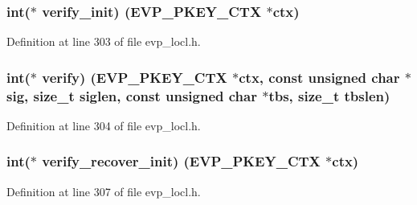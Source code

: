\subsubsection[{\texorpdfstring{verify\+\_\+init}{verify_init}}]{\setlength{\rightskip}{0pt plus 5cm}int($\ast$ verify\+\_\+init) ({\bf E\+V\+P\+\_\+\+P\+K\+E\+Y\+\_\+\+C\+TX} $\ast$ctx)}\hypertarget{structevp__pkey__method__st_a52c168da0ac4697f2d040515bf83e832}{}\label{structevp__pkey__method__st_a52c168da0ac4697f2d040515bf83e832}


Definition at line 303 of file evp\+\_\+locl.\+h.

\subsubsection[{\texorpdfstring{verify}{verify}}]{\setlength{\rightskip}{0pt plus 5cm}int($\ast$ verify) ({\bf E\+V\+P\+\_\+\+P\+K\+E\+Y\+\_\+\+C\+TX} $\ast$ctx, const unsigned char $\ast$sig, size\+\_\+t siglen, const unsigned char $\ast$tbs, size\+\_\+t tbslen)}\hypertarget{structevp__pkey__method__st_a4130d530978618dbcd8236e5df96bdcb}{}\label{structevp__pkey__method__st_a4130d530978618dbcd8236e5df96bdcb}


Definition at line 304 of file evp\+\_\+locl.\+h.

\subsubsection[{\texorpdfstring{verify\+\_\+recover\+\_\+init}{verify_recover_init}}]{\setlength{\rightskip}{0pt plus 5cm}int($\ast$ verify\+\_\+recover\+\_\+init) ({\bf E\+V\+P\+\_\+\+P\+K\+E\+Y\+\_\+\+C\+TX} $\ast$ctx)}\hypertarget{structevp__pkey__method__st_a5fd28dac772d0a8ebcbf136e4c56f836}{}\label{structevp__pkey__method__st_a5fd28dac772d0a8ebcbf136e4c56f836}


Definition at line 307 of file evp\+\_\+locl.\+h.

